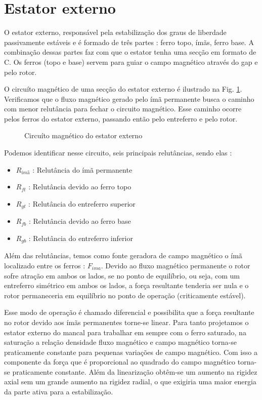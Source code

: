 \section{Estator externo}\label{cap:mancal:estator:externo}

O estator externo, responsável pela estabilização dos graus de liberdade passivamente estáveis e é formado de três partes : ferro topo, ímãs, ferro base. A combinação dessas partes faz com que o estator tenha uma secção em formato de C. Os ferros (topo e base) servem para guiar o campo magnético através do gap e pelo rotor. 

O circuíto magnético de uma secção do estator externo é ilustrado na Fig. \ref{Fig:mancal:circuito:passivo}. Verificamos que o fluxo magnético gerado pelo ímã permanente busca o caminho com menor relutância para fechar o circuito magnético. Esse caminho ocorre pelos ferros do estator externo, passando então pelo entreferro e  pelo rotor.

\begin{figure}[!ht]
	\centering
	\def\svgwidth{1\columnwidth}
	
	\caption{Circuíto magnético do estator externo}
	\label{Fig:mancal:circuito:passivo}
\end{figure}

Podemos identificar nesse circuito, seis principais relutâncias, sendo elas :

\begin{itemize}
	\item $R_{ímã}$ : Relutância do ímã permanente
	\item $R_{ft}$ : Relutância devido ao ferro topo
	\item $R_{gt}$ : Relutância do entreferro superior
	\item $R_{fb}$ : Relutância devido ao ferro base
	\item $R_{gb}$ : Relutância do entreferro inferior	
\end{itemize}

Além das relutâncias, temos como fonte geradora de campo magnético o ímã localizado entre os ferros : $F_{ima}$. Devido ao fluxo magnético permanente o rotor sofre atração em ambos os lados, se no ponto de equilíbrio, ou seja, com um entreferro simétrico em ambos os lados, a força resultante tenderia ser nula e o rotor permaneceria em equilíbrio no ponto de operação (criticamente estável). 

Esse modo de operação é chamado diferencial e possibilita que a força resultante no rotor devido aos ímãs permanentes torne-se linear. Para tanto projetamos o estator externo do mancal para trabalhar em sempre com o ferro saturado, na saturação a relação densidade fluxo magnético e campo magnético torna-se praticamente constante para pequenas variações de campo magnético. Com isso a componente da força que é proporcional ao quadrado do campo magnético torna-se praticamente constante. Além da linearização obtêm-se um aumento na rigidez axial sem um grande aumento na rigidez radial, o que exigiria uma maior energia da parte ativa para a estabilização.

